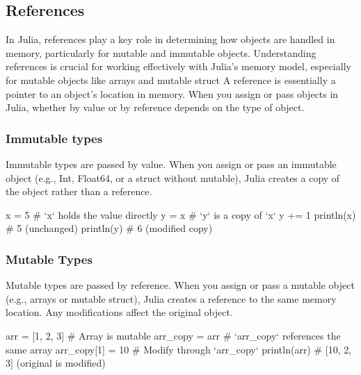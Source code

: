 \documentclass{report}
\begin{document}
     \bigbreak \noindent 
     \subsection{References}
     \bigbreak \noindent 
     In Julia, references play a key role in determining how objects are handled in memory, particularly for mutable and immutable objects. Understanding references is crucial for working effectively with Julia's memory model, especially for mutable objects like arrays and mutable struct
     \bigbreak \noindent 
     A reference is essentially a pointer to an object's location in memory. When you assign or pass objects in Julia, whether by value or by reference depends on the type of object.
     \bigbreak \noindent 
     \subsubsection{Immutable types}
     \bigbreak \noindent 
     Immutable types are passed by value. When you assign or pass an immutable object (e.g., Int, Float64, or a struct without mutable), Julia creates a copy of the object rather than a reference.
     \bigbreak \noindent 
     \begin{jlcode}
         x = 5  # `x` holds the value directly
         y = x  # `y` is a copy of `x`
         y += 1
         println(x)  # 5 (unchanged)
         println(y)  # 6 (modified copy)
     \end{jlcode}

     \bigbreak \noindent 
     \subsubsection{Mutable Types}
     \bigbreak \noindent 
     Mutable types are passed by reference.
     When you assign or pass a mutable object (e.g., arrays or mutable struct), Julia creates a reference to the same memory location. Any modifications affect the original object.
     \bigbreak \noindent 
     \begin{jlcode}
         arr = [1, 2, 3]  # Array is mutable
         arr_copy = arr    # `arr_copy` references the same array
         arr_copy[1] = 10  # Modify through `arr_copy`
         println(arr)      # [10, 2, 3] (original is modified)
     \end{jlcode}

     \bigbreak \noindent 
\end{document}
